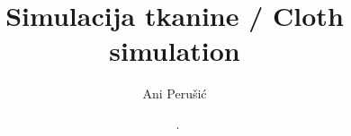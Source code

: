 \documentclass[botnum,a4paper,11,oneside,final]{tex_aux/rithesis}
\begin{document}
\frontmatter   %



\title{Simulacija tkanine / Cloth simulation}   %

\date{\MONTH~\the\year.}   %

\author{Ani Perušić}  %
\maketitle		%



\maketitleabstract

\begin{assignmentpage}
\end{assignmentpage}

\begin{honestystatementpage}
	
\end{honestystatementpage}

\begin{acknowledgments} %
	  
\end{acknowledgments}

\tableofcontents
\listoffigures
\listoftables

\mainmatter		%

 
\end{document}
